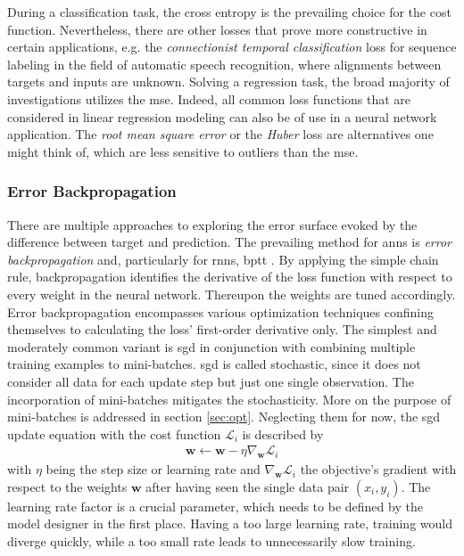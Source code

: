 During a classification task, the cross entropy is the prevailing choice for the cost function.
Nevertheless, there are other losses that prove more constructive in certain applications, e.g. the \textit{connectionist temporal classification} loss for sequence labeling in the field of automatic speech recognition, where alignments between targets and inputs are unknown. 
Solving a regression task, the broad majority of investigations utilizes the \gls{mse}.
Indeed, all common loss functions that are considered in linear regression modeling can also be of use in a neural network application.
The \textit{root mean square error} or the \textit{Huber} loss are alternatives one might think of, which are less sensitive to outliers than the \gls{mse}.

\subsubsection{Error Backpropagation}
There are multiple approaches to exploring the error surface evoked by the difference between target and prediction.
The prevailing method for \glspl{ann} is \textit{error backpropagation} and, particularly for \glspl{rnn}, \gls{bptt}  \cite{ LeBo1998, Lipton2015, Werbos1990}.
By applying the simple chain rule, backpropagation identifies the derivative of the loss function with respect to every weight in the neural network.
Thereupon the weights are tuned accordingly.
Error backpropagation encompasses various optimization techniques confining themselves to calculating the loss' first-order derivative only.
The simplest and moderately common variant is \gls{sgd} in conjunction with combining multiple training examples to mini-batches.
\gls{sgd} is called stochastic, since it does not consider all data for each update step but just one single observation.
The incorporation of mini-batches mitigates the stochasticity.
More on the purpose of mini-batches is addressed in section \ref{sec:opt}.
Neglecting them for now, the \gls{sgd} update equation with the cost function $\mathcal{L}_i$ is described by
\begin{align}\label{eq:sgd}
	\bm{w}\gets\bm{w}-\eta\nabla_{\bm{w}}\mathcal{L}_i 
\end{align}
with $\eta$ being the step size or learning rate and $\nabla_{\bm{w}}\mathcal{L}_i $ the objective's gradient with respect to the weights $\bm{w}$ after having seen the single data pair $(x_i, y_i)$.
The learning rate factor is a crucial parameter, which needs to be defined by the model designer in the first place.
Having a too large learning rate, training would diverge quickly, while a too small rate leads to unnecessarily slow training.

